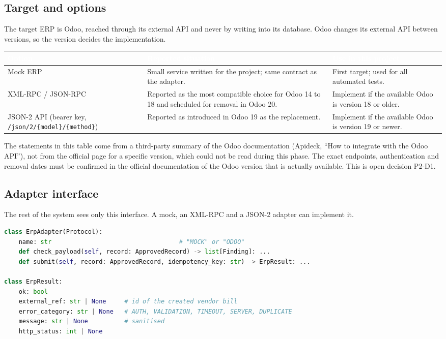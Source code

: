 \documentclass[11pt,a4paper]{report}
\newcommand{\hdr}[1]{\textcolor{white}{\sffamily\bfseries #1}}
\newcommand{\tblstart}{\rowcolors{2}{white}{rowgray}\arrayrulecolor{teal!60}}
\newcommand{\hdrrow}{\rowcolor{navy}}
\begin{document}
\subsection{Target and options}
The target ERP is Odoo, reached through its external API and never by writing into its database. Odoo changes its external API between versions, so the version decides the implementation.
{\tblstart\small
\begin{longtable}{L{3.4cm}L{5.4cm}L{5.0cm}}
\hdrrow \hdr{Option} & \hdr{Reported situation} & \hdr{Use in this project}\\ \endhead
Mock ERP & Small service written for the project; same contract as the adapter. & First target; used for all automated tests.\\
XML-RPC / JSON-RPC & Reported as the most compatible choice for Odoo 14 to 18 and scheduled for removal in Odoo 20. & Implement if the available Odoo is version 18 or older.\\
JSON-2 API (bearer key, \texttt{/json/2/\allowbreak\{model\}/\allowbreak\{method\}}) & Reported as introduced in Odoo 19 as the replacement. & Implement if the available Odoo is version 19 or newer.\\
\hline
\end{longtable}}
\begin{warnbox}
The statements in this table come from a third-party summary of the Odoo documentation (Apideck, ``How to integrate with the Odoo API''), not from the official page for a specific version, which could not be read during this phase. The exact endpoints, authentication and removal dates must be confirmed in the official documentation of the Odoo version that is actually available. This is open decision P2-D1.
\end{warnbox}

\subsection{Adapter interface}
The rest of the system sees only this interface. A mock, an XML-RPC and a JSON-2 adapter can implement it.
\begin{lstlisting}[language=Python]
class ErpAdapter(Protocol):
    name: str                                   # "MOCK" or "ODOO"
    def check_payload(self, record: ApprovedRecord) -> list[Finding]: ...
    def submit(self, record: ApprovedRecord, idempotency_key: str) -> ErpResult: ...

class ErpResult:
    ok: bool
    external_ref: str | None     # id of the created vendor bill
    error_category: str | None   # AUTH, VALIDATION, TIMEOUT, SERVER, DUPLICATE
    message: str | None          # sanitised
    http_status: int | None
\end{lstlisting}
\end{document}
